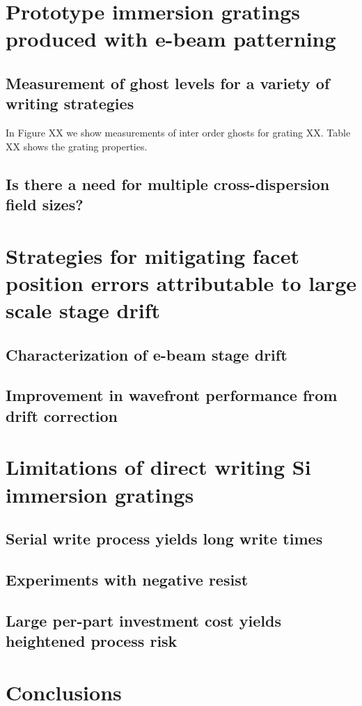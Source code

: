 \documentclass[]{spie}  %
\begin{document}
\section{Prototype immersion gratings produced with e-beam patterning}



\subsection{Measurement of ghost levels for a variety of writing strategies}
\label{sec:MeasGhost}
In Figure XX we show measurements of inter order ghosts for grating XX.  Table XX shows the grating properties. 


\subsection{Is there a need for multiple cross-dispersion field sizes?}
\section{Strategies for mitigating facet position errors attributable to large scale stage drift}
\subsection{Characterization of e-beam stage drift}
\subsection{Improvement in wavefront performance from drift correction}
\section{Limitations of direct writing Si immersion gratings}
\subsection{Serial write process yields long write times}
\subsection{Experiments with negative resist}
\subsection{Large per-part investment cost yields heightened process risk}
\section{Conclusions}
\end{document}
